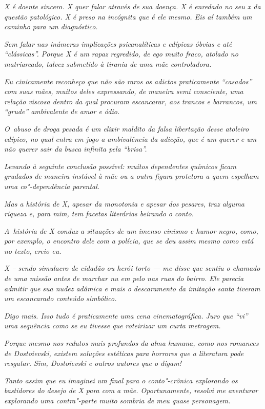 \emph{X é doente sincero. X quer falar através de sua doença. X é
enredado no seu x da questão patológico. X é preso na incógnita que é
ele mesmo. Eis aí também um caminho para um diagnóstico.}~

\emph{Sem falar nas inúmeras implicações psicanalíticas e edípicas
óbvias e até ``clássicas''. Porque X é um rapaz regredido, de ego muito
fraco, atolado no matriarcado, talvez submetido à tirania de uma mãe
controladora.}~

\emph{Eu cinicamente reconheço que não são raros os adictos praticamente
``casados'' com suas mães, muitos deles expressando, de maneira semi
consciente, uma relação viscosa dentro da qual procuram escancarar, aos
trancos e barrancos, um ``grude'' ambivalente de amor e ódio.}~

\emph{O~abuso de droga pesada é um elixir maldito da falsa libertação
desse atoleiro edípico, no qual entra em jogo a ambivalência da adicção,
que é um querer e um não querer sair da busca infinita pela ``brisa''.}~

\emph{Levando à seguinte conclusão possível: muitos dependentes químicos
ficam grudados de maneira instável à mãe ou a outra figura protetora a
quem espelham uma co"-dependência parental.}~

\emph{Mas a história de X, apesar da monotonia e apesar dos pesares, traz
alguma riqueza e, para mim, tem facetas literárias beirando o conto.}~

\emph{A~história de X conduz a situações de um imenso cinismo e humor
negro, como, por exemplo, o encontro dele com a polícia, que se deu
assim mesmo como está no texto, creio eu.}~

\emph{X -- sendo simulacro de cidadão ou herói torto --- me disse que
sentiu o chamado de uma missão antes de marchar nu em pelo nas ruas do
bairro. Ele parecia admitir que sua nudez adâmica e mais o descaramento
da imitação santa tiveram um escancarado conteúdo simbólico.}

\emph{Digo mais. Isso tudo é praticamente uma cena cinematográfica. Juro
que ``vi'' uma sequência como se eu tivesse que roteirizar um curta
metragem.}~

\emph{Porque mesmo nos redutos mais profundos da alma humana, como nos
romances de Dostoievski, existem soluções estéticas para horrores que a
literatura pode resgatar. Sim, Dostoievski e outros autores que o
digam!}~

\emph{Tanto assim que eu imaginei um final para o conto"-crônica
explorando os bastidores do desejo de X para com a mãe. Oportunamente,
resolvi me aventurar explorando uma contra"-parte muito sombria de meu
quase personagem.}~

